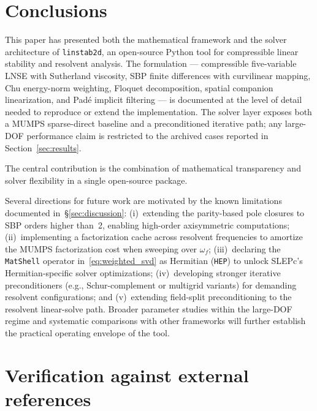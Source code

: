 \documentclass[11pt]{article}
\begin{document}
\section{Conclusions}
\label{sec:conclusions}

This paper has presented both the mathematical framework and the solver architecture of \texttt{linstab2d}, an open-source Python tool for compressible linear stability and resolvent analysis.
The formulation --- compressible five-variable LNSE with Sutherland viscosity, SBP finite differences with curvilinear mapping, Chu energy-norm weighting, Floquet decomposition, spatial companion linearization, and Pad\'e implicit filtering --- is documented at the level of detail needed to reproduce or extend the implementation.
The solver layer exposes both a MUMPS sparse-direct baseline and a preconditioned iterative path; any large-DOF performance claim is restricted to the archived cases reported in Section~\ref{sec:results}.

The central contribution is the combination of mathematical transparency and solver flexibility in a single open-source package.

Several directions for future work are motivated by the known limitations documented in~\S\ref{sec:discussion}:
(i)~extending the parity-based pole closures to SBP orders higher than~2, enabling high-order axisymmetric computations;
(ii)~implementing a factorization cache across resolvent frequencies to amortize the MUMPS factorization cost when sweeping over $\omega_f$;
(iii)~declaring the \texttt{MatShell} operator in~\eqref{eq:weighted_svd} as Hermitian (\texttt{HEP}) to unlock SLEPc's Hermitian-specific solver optimizations;
(iv)~developing stronger iterative preconditioners (e.g., Schur-complement or multigrid variants) for demanding resolvent configurations;
and (v)~extending field-split preconditioning to the resolvent linear-solve path.
Broader parameter studies within the large-DOF regime and systematic comparisons with other frameworks will further establish the practical operating envelope of the tool.

\appendix
\section{Verification against external references}
\label{sec:app:martini_verification}
\end{document}

